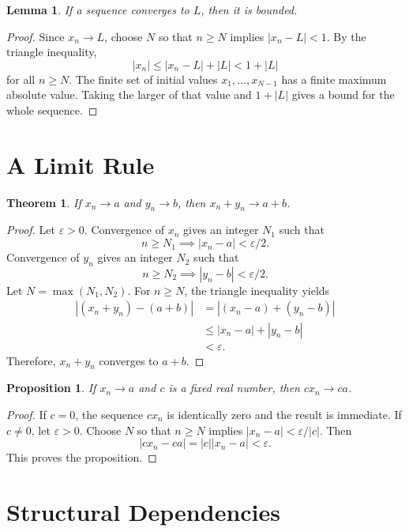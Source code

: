 \documentclass{article}
\newtheorem{lemma}[definition]{Lemma}
\newtheorem{theorem}[definition]{Theorem}
\newtheorem{proposition}[definition]{Proposition}
\begin{document}
\begin{lemma}
If a sequence converges to $L$, then it is bounded.
\end{lemma}

\begin{proof}
Since $x_n\to L$, choose $N$ so that $n\geq N$ implies
$|x_n-L|<1$. By the triangle inequality,
\[
|x_n|\leq |x_n-L|+|L|<1+|L|
\]
for all $n\geq N$. The finite set of initial values
$x_1,\ldots,x_{N-1}$ has a finite maximum absolute value. Taking the
larger of that value and $1+|L|$ gives a bound for the whole sequence.
\end{proof}

\section{A Limit Rule}

\begin{theorem}
If $x_n\to a$ and $y_n\to b$, then $x_n+y_n\to a+b$.
\end{theorem}

\begin{proof}
Let $\varepsilon>0$. Convergence of $x_n$ gives an integer $N_1$ such
that
\[
n\geq N_1\implies |x_n-a|<\varepsilon/2.
\]
Convergence of $y_n$ gives an integer $N_2$ such that
\[
n\geq N_2\implies |y_n-b|<\varepsilon/2.
\]
Let $N=\max(N_1,N_2)$. For $n\geq N$, the triangle inequality yields
\begin{align}
|(x_n+y_n)-(a+b)|
&=|(x_n-a)+(y_n-b)|\\
&\leq |x_n-a|+|y_n-b|\\
&<\varepsilon.
\end{align}
Therefore, $x_n+y_n$ converges to $a+b$.
\end{proof}

\begin{proposition}
If $x_n\to a$ and $c$ is a fixed real number, then $cx_n\to ca$.
\end{proposition}

\begin{proof}
If $c=0$, the sequence $cx_n$ is identically zero and the result is
immediate. If $c\ne 0$, let $\varepsilon>0$. Choose $N$ so that
$n\geq N$ implies $|x_n-a|<\varepsilon/|c|$. Then
\[
|cx_n-ca|=|c||x_n-a|<\varepsilon.
\]
This proves the proposition.
\end{proof}

\section{Structural Dependencies}
\end{document}
